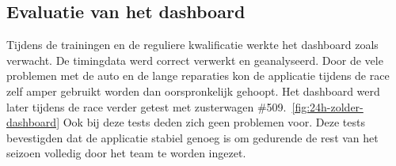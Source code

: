 \subsection*{Evaluatie van het dashboard}

Tijdens de trainingen en de reguliere kwalificatie werkte het dashboard zoals verwacht. De timingdata werd correct verwerkt en geanalyseerd. Door de vele problemen met de auto en de lange reparaties kon de applicatie tijdens de race zelf amper gebruikt worden dan oorspronkelijk gehoopt.
Het dashboard werd later tijdens de race verder getest met zusterwagen \#509.~\ref{fig:24h-zolder-dashboard} Ook bij deze tests deden zich geen problemen voor. Deze tests bevestigden dat de applicatie stabiel genoeg is om gedurende de rest van het seizoen volledig door het team te worden ingezet.